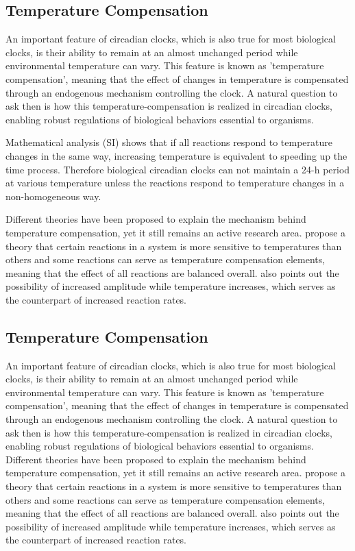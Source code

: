 \documentclass[a4paper,10pt]{article}
\numberwithin{equation}{section}
\begin{document}
\subsection{Temperature Compensation}




An important feature of circadian clocks, which is also true for most biological clocks, is their ability to remain at an almost unchanged period while environmental temperature can vary. This feature is known as 'temperature compensation', meaning that the effect of changes in temperature is compensated through an endogenous mechanism controlling the clock. A natural question to ask then is how this temperature-compensation is realized in circadian clocks, enabling robust regulations of biological behaviors essential to organisms.


Mathematical analysis (SI) shows that if all reactions respond to temperature changes in the same way, increasing temperature is equivalent to speeding up the time process. Therefore biological circadian clocks can not maintain a 24-h period at various temperature unless the reactions respond to temperature changes in a non-homogeneous way.

Different theories have been proposed to explain the mechanism behind temperature compensation, yet it still remains an active research area. \citet{hastings1957} propose a theory that certain reactions in a system is more sensitive to temperatures than others and some reactions can serve as temperature compensation elements, meaning that the effect of all reactions are balanced overall. \citet{lakin1991} also points out the possibility of increased amplitude while temperature increases, which serves as the counterpart of increased reaction rates. 



\subsection{Temperature Compensation}
An important feature of circadian clocks, which is also true for most biological clocks, is their ability to remain at an almost unchanged period while environmental temperature can vary. This feature is known as 'temperature compensation', meaning that the effect of changes in temperature is compensated through an endogenous mechanism controlling the clock. A natural question to ask then is how this temperature-compensation is realized in circadian clocks, enabling robust regulations of biological behaviors essential to organisms.
Different theories have been proposed to explain the mechanism behind temperature compensation, yet it still remains an active research area. \citet{hastings1957} propose a theory that certain reactions in a system is more sensitive to temperatures than others and some reactions can serve as temperature compensation elements, meaning that the effect of all reactions are balanced overall. \citet{lakin1991} also points out the possibility of increased amplitude while temperature increases, which serves as the counterpart of increased reaction rates. 
\end{document}
